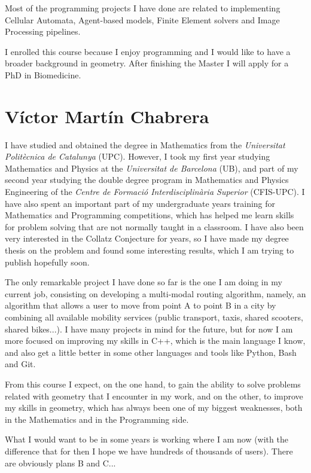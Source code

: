 \documentclass[11pt]{amsart}
\begin{document}
Most of the programming projects I have done are related to implementing
Cellular Automata, Agent-based models, Finite Element solvers
and Image Processing pipelines.

I enrolled this course because I enjoy programming
and I would like to have a broader background in geometry.
After finishing the Master I will apply for a PhD in Biomedicine.

\section*{Víctor Martín Chabrera}

I have studied and obtained the degree in Mathematics from the \textit{Universitat Politècnica de Catalunya} (UPC). However, I took my first year studying Mathematics and Physics at the \textit{Universitat de Barcelona} (UB), and part of my second year studying the double degree program in Mathematics and Physics Engineering of the \textit{Centre de Formació Interdisciplinària Superior} (CFIS-UPC). I have also spent an important part of my undergraduate years training for Mathematics and Programming competitions, which has helped me learn skills for problem solving that are not normally taught in a classroom. I have also been very interested in the Collatz Conjecture for years, so I have made my degree thesis on the problem and found some interesting results, which I am trying to publish hopefully soon. 

The only remarkable project I have done so far is the one I am doing in my current job, consisting on developing a multi-modal routing algorithm, namely, an algorithm that allows a user to move from point A to point B in a city by combining all available mobility services (public transport, taxis, shared scooters, shared bikes...). I have many projects in mind for the future, but for now I am more focused on improving my skills in C++, which is the main language I know, and also get a little better in some other languages and tools like Python, Bash and Git.

From this course I expect, on the one hand, to gain the ability to solve problems related with geometry that I encounter in my work, and on the other, to improve my skills in geometry, which has always been one of my biggest weaknesses, both in the Mathematics and in the Programming side.

What I would want to be in some years is working where I am now (with the difference that for then I hope we have hundreds of thousands of users). There are obviously plans B and C...
\end{document}
